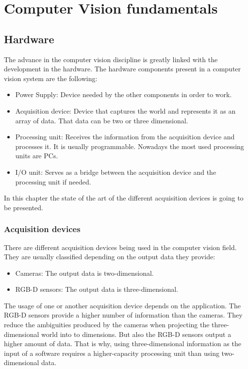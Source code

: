 \chapter{Computer Vision fundamentals}


\section{Hardware}

The advance in the computer vision discipline is greatly linked with the development in the hardware. 
The hardware components present in a computer vision system are the following: 

\begin{itemize}
	\item{Power Supply: } Device needed by the other components in order to work. 
	\item{Acquisition device: } Device that captures the world and represents it as an array of data. That data can be two or three dimensional. 
	\item{Processing unit:} Receives the information from the acquisition device and processes it. It is usually programmable. Nowadays the most used processing units are PCs. 
	\item{I/O unit: } Serves as a bridge between the acquisition device and the processing unit if needed. 

\end{itemize}

In this chapter the state of the art of the different acquisition devices is going to be presented. 

\subsection{Acquisition devices}
There are different acquisition devices being used in the computer vision field. 
They are usually classified depending on the output data they provide: 

\begin{itemize}
	\item{Cameras:}	The output data is two-dimensional. 
	\item{RGB-D sensors:} The output data is three-dimensional. 
\end{itemize}

The usage of one or another acquisition device depends on the application. 
The RGB-D sensors provide a higher number of information than the cameras. 
They reduce the ambiguities produced by the cameras when projecting the three-dimensional world into to dimensions. 
But also the RGB-D sensors output a higher amount of data. 
That is why, using three-dimensional information as the input of a software requires a higher-capacity processing unit than using two-dimensional data.




